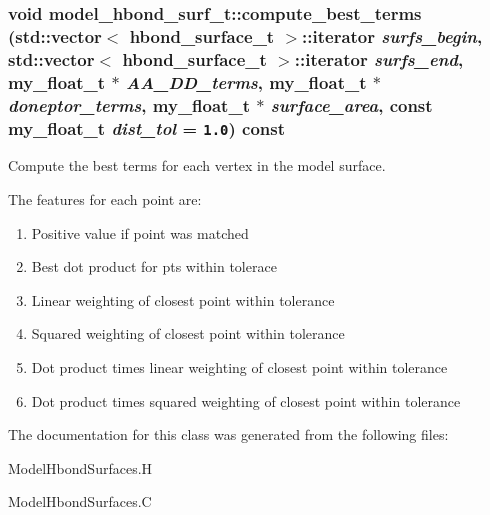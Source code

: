 \subsubsection{\setlength{\rightskip}{0pt plus 5cm}void model\_\-hbond\_\-surf\_\-t::compute\_\-best\_\-terms (std::vector$<$ \bf{hbond\_\-surface\_\-t} $>$::iterator {\em surfs\_\-begin}, std::vector$<$ \bf{hbond\_\-surface\_\-t} $>$::iterator {\em surfs\_\-end}, my\_\-float\_\-t $\ast$ {\em AA\_\-DD\_\-terms}, my\_\-float\_\-t $\ast$ {\em doneptor\_\-terms}, my\_\-float\_\-t $\ast$ {\em surface\_\-area}, const my\_\-float\_\-t {\em dist\_\-tol} = {\tt 1.0}) const}\label{classSimSite3D_1_1model__hbond__surf__t_a8ae4c19a792214f114129077475df01}


Compute the best terms for each vertex in the model surface. 

The features for each point are: \begin{enumerate}
\item Positive value if point was matched \item Best dot product for pts within tolerace \item Linear weighting of closest point within tolerance \item Squared weighting of closest point within tolerance \item Dot product times linear weighting of closest point within tolerance \item Dot product times squared weighting of closest point within tolerance \end{enumerate}


The documentation for this class was generated from the following files:\begin{CompactItemize}
\item 
Model\-Hbond\-Surfaces.H\item 
Model\-Hbond\-Surfaces.C\end{CompactItemize}
